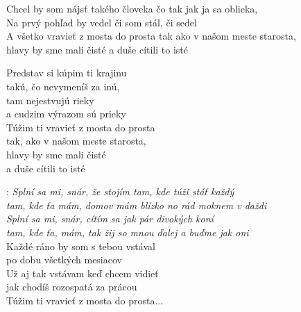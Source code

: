 
Chcel by som nájsť takého človeka čo tak jak ja sa oblieka,\\
Na prvý pohľad by vedel či som stál, či sedel\\

A všetko vravieť z mosta do prosta tak ako v našom meste starosta,\\
hlavy by sme mali čisté a duše cítili to isté\\

\vspace{-15pt}\begin{multicols}{2}
Predstav si kúpim ti krajinu\\
takú, čo nevymeníš za inú,\\
tam nejestvujú rieky\\
a cudzim výrazom sú prieky\\

Túžim ti vravieť z mosta do prosta\\
tak, ako v našom meste starosta,\\
hlavy by sme mali čisté\\
a duše cítili to isté\\

\end{multicols}

\textregistered: \emph{Splní sa mi, snár, že stojím tam, kde túži stáť každý\\
tam, kde ťa mám, domov mám blízko no rád moknem v daždi}\\

\emph{Splní sa mi, snár, cítím sa jak pár divokých koní\\
tam, kde ťa, mám, tak žij so mnou ďalej a buďme jak oni}\\

Každé ráno by som s tebou vstával\\
po dobu všetkých mesiacov\\
Už aj tak vstávam keď chcem vidieť\\
jak chodíš rozospatá za prácou\\
Túžim ti vravieť z mosta do prosta...\\

\textregistered

\newpage
